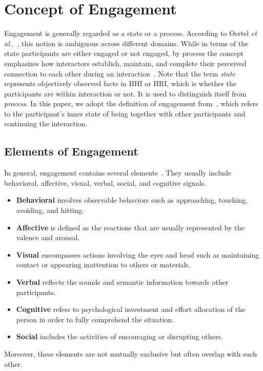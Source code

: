 \documentclass[twocolumn]{svjour3}
\makeatletter
\DeclareRobustCommand\onedot{\futurelet\@let@token\@onedot}
\def\@onedot{\ifx\@let@token.\else.\null\fi\xspace}
\def\etal{\emph{et al}\onedot}
\makeatother
\begin{document}
\section{Concept of Engagement}
\label{subs:What_Is_Engagement}
Engagement is generally regarded as a state or a process. According to Oertel \etal~\cite{Oertel2020Engagement}, this notion is ambiguous across different domains. While in terms of the state participants are either engaged or not engaged, by process the concept emphasizes how  interactors establish, maintain, and complete their perceived connection to each other during an interaction~\cite{Sidner2005Explorations}.
Note that the term  {\em state}  represents objectively observed facts in HHI or HRI, which is whether the participants are within interaction or not.
It is used to distinguish itself from \textit{process}. In this paper, we adopt the definition of engagement from~\cite{Poggi2013Mind}, which refers to the participant's inner state of being together with other participants and continuing the interaction.

\subsection{Elements of Engagement} 
In general, engagement contains several elements~\cite{Castellano2009Detecting, Guhan2020ABCNet, Sumer2021Multimodal, Christenson2012Handbook, OBrien2008What, CohenMansfield2011Comprehensive, Archambault2017Joint, BenEliyahu2018Investigating, Corrigan2016Engagement, Perugia2020ENGAGEDEM}. They usually include behavioral, affective, visual, verbal, social, and cognitive signals. 
\begin{itemize}
  \item \textbf{Behavioral} involves observable behaviors such as approaching, touching, avoiding, and hitting.
  \item \textbf{Affective} is defined as the reactions that are usually represented by the valence and arousal.
  \item \textbf{Visual} encompasses actions involving the eyes and head such as maintaining contact or appearing inattention to others or materials.
  \item \textbf{Verbal} reflects the sounds and semantic information towards other participants.
  \item \textbf{Cognitive} refers to psychological investment and effort allocation of the person in order to fully comprehend the situation.
  \item \textbf{Social} includes the activities of encouraging or disrupting others.
\end{itemize}
Moreover, these elements are not mutually exclusive but often overlap with each other.
\end{document}
